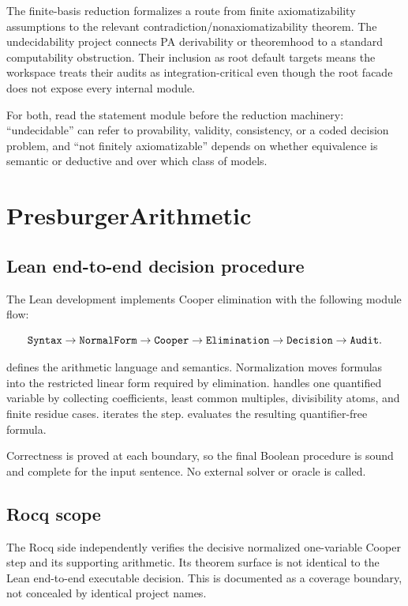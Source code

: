 \documentclass[
  10pt,
  a4paper,
  twoside,
  open=any,
  parskip=half,
  headings=big
]{scrreprt}
\newcommand{\code}[1]{\texttt{\detokenize{#1}}}
\begin{document}
The finite-basis reduction formalizes a route from finite axiomatizability
assumptions to the relevant contradiction/nonaxiomatizability theorem.  The
undecidability project connects PA derivability or theoremhood to a standard
computability obstruction.  Their inclusion as root default targets means the
workspace treats their audits as integration-critical even though the root
facade does not expose every internal module.

For both, read the statement module before the reduction machinery:
``undecidable'' can refer to provability, validity, consistency, or a coded
decision problem, and ``not finitely axiomatizable'' depends on whether
equivalence is semantic or deductive and over which class of models.

\section{PresburgerArithmetic}
\label{sec:presburger}

\subsection{Lean end-to-end decision procedure}

The Lean development implements Cooper elimination with the following module
flow:

\[
\code{Syntax}
\to \code{NormalForm}
\to \code{Cooper}
\to \code{Elimination}
\to \code{Decision}
\to \code{Audit}.
\]

\code{Syntax} defines the arithmetic language and semantics.  Normalization
moves formulas into the restricted linear form required by elimination.
\code{Cooper} handles one quantified variable by collecting coefficients,
least common multiples, divisibility atoms, and finite residue cases.
\code{Elimination} iterates the step.  \code{Decision} evaluates the resulting
quantifier-free formula.

Correctness is proved at each boundary, so the final Boolean procedure is
sound and complete for the input sentence.  No external solver or oracle is
called.

\subsection{Rocq scope}

The Rocq side independently verifies the decisive normalized one-variable
Cooper step and its supporting arithmetic.  Its theorem surface is not
identical to the Lean end-to-end executable decision.  This is documented as
a coverage boundary, not concealed by identical project names.
\end{document}
